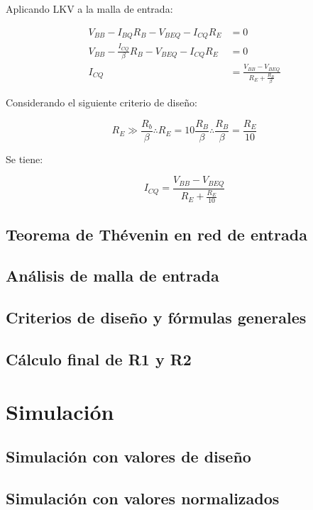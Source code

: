 \documentclass[chaptersright]{informeutn}
\begin{document}
    Aplicando LKV a la malla de entrada:

    \begin{align*}
        V_{BB} - I_{BQ} R_B - V_{BEQ} - I_{CQ} R_E &= 0 \\
        V_{BB} - \frac{I_{CQ}}{\beta} R_B - V_{BEQ} - I_{CQ} R_E &= 0 \\
        I_{CQ} &= \frac{V_{BB} - V_{BEQ}}{R_E + \frac{R_B}{\beta}} 
    \end{align*}

Considerando el siguiente criterio de diseño: 

\begin{equation*}
    R_E  \gg \frac{R_b}{\beta} \therefore R_E = 10\frac{R_B}{\beta} \therefore \frac{R_B}{\beta} = \frac{R_E}{10}
\end{equation*}

Se tiene:

\begin{equation*}
    I_{CQ} = \frac{V_{BB} - V_{BEQ}} {R_E + \frac{R_E}{10}}
\end{equation*}


    

\subsection{Teorema de Thévenin en red de entrada}
    \subsection{Análisis de malla de entrada}
    \subsection{Criterios de diseño y fórmulas generales}
    \subsection{Cálculo final de R1 y R2} \label{section:calc_r1_r2}
  \section{Simulación}
    \subsection{Simulación con valores de diseño}
    \subsection{Simulación con valores normalizados}
\end{document}
